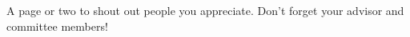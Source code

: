 \acknowledgment

A page or two to shout out people you appreciate. 
Don't forget your advisor and committee members!

